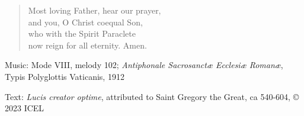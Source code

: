\hymn



\setlength{\leftmargini}{2em}
\begin{verse}
Most loving Father, hear our prayer,\\
and you, O Christ coequal Son,\\
who with the Spirit Paraclete\\
now reign for all eternity. Amen.
\end{verse}
\setlength{\leftmargini}{\defleftmargini}

\begin{hymnsource}
Music: Mode VIII, melody 102; \emph{Antiphonale Sacrosanctæ Ecclesiæ Romanæ}, Typis Polyglottis Vaticanis, 1912

Text: \emph{Lucis creator optime}, attributed to Saint Gregory the Great, ca 540-604, © 2023 ICEL
\end{hymnsource}
